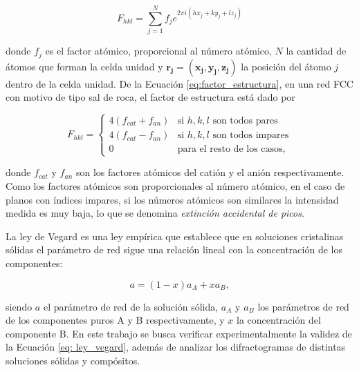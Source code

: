 \begin{equation}
    F_{hkl} = \sum_{j=1}^{N} f_j e^{2\pi i (h x_j + k y_j + l z_j)}
\label{eq:factor_estructura}
\end{equation}

\noindent donde $f_j$ es el factor atómico, proporcional al número atómico, $N$ la cantidad de átomos que forman la celda unidad y $\mathbf{r_j=(x_j, y_j, z_j)}$ la posición del átomo $j$ dentro de la celda unidad. De la Ecuación \ref{eq:factor_estructura}, en una red FCC con motivo de tipo sal de roca, el factor de estructura está dado por

\begin{equation}
    F_{hkl}=\begin{cases}
    4(f_{cat}+f_{an}) & \text{si } h,k,l \text{ son todos pares} \\
    4(f_{cat}-f_{an}) & \text{si } h,k,l \text{ son todos impares} \\
    0 & \text{para el resto de los casos},
    \end{cases}
    \label{eq:Impares}
\end{equation}

\noindent donde $f_{cat}$ y $f_{an}$ son los factores atómicos del catión y el anión respectivamente. Como los factores atómicos son proporcionales al número atómico, en el caso de planos con índices impares, si los números atómicos son similares la intensidad medida es muy baja, lo que se denomina \textit{extinción accidental de picos}.

La ley de Vegard \cite{Vegard1921} es una ley empírica que establece que en soluciones cristalinas sólidas el parámetro de red sigue una relación lineal con la concentración de los componentes:

\begin{equation}
    a = (1-x)a_A + xa_B,
\label{eq: ley_vegard}
\end{equation}

\noindent siendo $a$ el parámetro de red de la solución sólida, $a_A$ y $a_B$ los parámetros de red de los componentes puros A y B respectivamente, y $x$ la concentración del componente B. En este trabajo se busca verificar experimentalmente la validez de la Ecuación \ref{eq: ley_vegard}, además de analizar los difractogramas de distintas soluciones sólidas y compósitos.